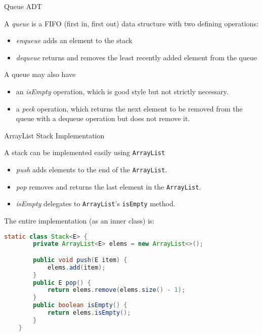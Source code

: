 \documentclass{beamer}
\begin{document}
\begin{frame}[fragile]{Queue ADT}


A {\it queue} is a FIFO (first in, first out) data structure with two defining operations:
\begin{itemize}
\item {\it enqueue} adds an element to the stack
\item {\it dequeue} returns and removes the least recently added element from the queue
\end{itemize}

A queue may also have 
\begin{itemize}
\item an {\it isEmpty} operation, which is good style but not strictly necessary.
\item a {\it peek} operation, which returns the next element to be removed from the queue with a dequeue operation but does not remove it.
\end{itemize}

\end{frame}

\begin{frame}[fragile]{ArrayList Stack Implementation}


A stack can be implemented easily using {\tt ArrayList}

\begin{itemize}
\item {\it push} adds elements to the end of the {\tt ArrayList}.
\item {\it pop} removes and returns the last element in the {\tt ArrayList}.
\item {\it isEmpty} delegates to {\tt ArrayList}'s {\tt isEmpty} method.
\end{itemize}

The entire implementation (as an inner class) is:
\begin{lstlisting}[language=Java]
    static class Stack<E> {
        private ArrayList<E> elems = new ArrayList<>();

        public void push(E item) {
            elems.add(item);
        }
        public E pop() {
            return elems.remove(elems.size() - 1);
        }
        public boolean isEmpty() {
            return elems.isEmpty();
        }
    }
\end{lstlisting}

\end{frame}
\end{document}
